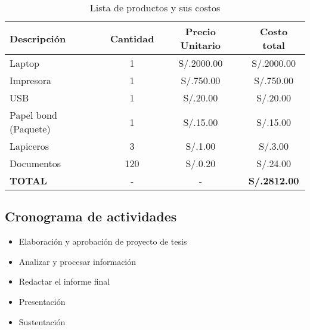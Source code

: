 \begin{table}[h!]
    \caption{Lista de productos y sus costos}
    \begin{tabular}{|l|c|c|c|}
        \hline
        \textbf{Descripción} & \textbf{Cantidad} & \textbf{Precio Unitario} & \textbf{Costo total} \\
        \hline
        Laptop & 1 & S/.2000.00 & S/.2000.00 \\
        \hline
        Impresora & 1 & S/.750.00 & S/.750.00 \\
        \hline
        USB & 1 & S/.20.00 & S/.20.00 \\
        \hline
        Papel bond (Paquete) & 1 & S/.15.00 & S/.15.00 \\
        \hline
        Lapiceros & 3 & S/.1.00 & S/.3.00 \\
        \hline
        Documentos & 120 & S/.0.20 & S/.24.00 \\
        \hline
        \textbf{TOTAL} & - & - & \textbf{S/.2812.00} \\
        \hline
    \end{tabular}
    
\end{table}

\subsection{Cronograma de actividades}

\begin{itemize}
	\item  Elaboración y aprobación de proyecto de tesis
	\item Analizar y procesar información
	\item Redactar el informe final
	\item Presentación
	\item Sustentación
\end{itemize}

